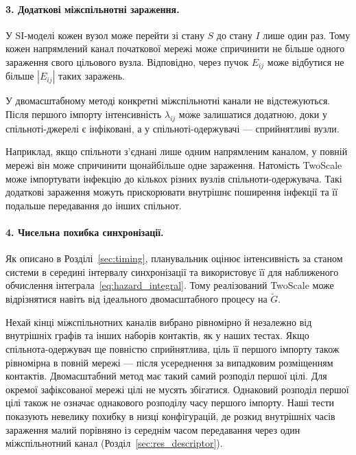 \paragraph{3. Додаткові міжспільнотні зараження.}
У SI-моделі кожен вузол може перейти зі стану $S$ до стану $I$ лише один раз. Тому кожен напрямлений канал початкової мережі може спричинити не більше одного зараження свого цільового вузла. Відповідно, через пучок $E_{ij}$ може відбутися не більше $|E_{ij}|$ таких заражень.

У двомасштабному методі конкретні міжспільнотні канали не відстежуються. Після першого імпорту інтенсивність $\lambda_{ij}$ може залишатися додатною, доки у спільноті-джерелі є інфіковані, а у спільноті-одержувачі --- сприйнятливі вузли.

Наприклад, якщо спільноти з'єднані лише одним напрямленим каналом, у повній мережі він може спричинити щонайбільше одне зараження. Натомість TwoScale може імпортувати інфекцію до кількох різних вузлів спільноти-одержувача. Такі додаткові зараження можуть прискорювати внутрішнє поширення інфекції та її подальше передавання до інших спільнот.



\paragraph{4. Чисельна похибка синхронізації.}
Як описано в Розділі~\ref{sec:timing}, планувальник оцінює інтенсивність за станом системи в середині інтервалу синхронізації та використовує її для наближеного обчислення інтеграла~\eqref{eq:hazard_integral}. Тому реалізований TwoScale може відрізнятися навіть від ідеального двомасштабного процесу на $\tilde G$.


\begin{remark}
\label{rem:placement}
Нехай кінці міжспільнотних каналів вибрано рівномірно й незалежно від внутрішніх графів та інших наборів контактів, як у наших тестах. Якщо спільнота-одержувач ще повністю сприйнятлива, ціль її першого імпорту також рівномірна в повній мережі --- після усереднення за випадковим розміщенням контактів. Двомасштабний метод має такий самий розподіл першої цілі. Для окремої зафіксованої мережі цілі не мусять збігатися. Однаковий розподіл першої цілі також не означає однакового розподілу часу першого імпорту. Наші тести показують невелику похибку в низці конфігурацій, де розкид внутрішніх часів зараження малий порівняно
із середнім часом передавання через один міжспільнотний
канал (Розділ~\ref*{sec:res_descriptor}).
\end{remark}

